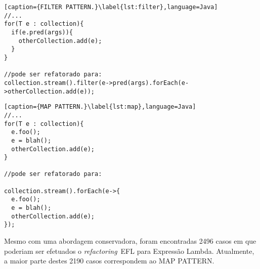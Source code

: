 \begin{lstlisting}[caption={FILTER PATTERN.}\label{lst:filter},language=Java] 
//...
for(T e : collection){
  if(e.pred(args)){
    otherCollection.add(e);
  }
}

//pode ser refatorado para:
collection.stream().filter(e->pred(args).forEach(e->otherCollection.add(e));
\end{lstlisting}

\begin{lstlisting}[caption={MAP PATTERN.}\label{lst:map},language=Java] 
//...
for(T e : collection){
  e.foo();
  e = blah();
  otherCollection.add(e);
}

//pode ser refatorado para:

collection.stream().forEach(e->{
  e.foo();
  e = blah();
  otherCollection.add(e);
});
\end{lstlisting}

Mesmo com uma abordagem conservadora, foram encontradas \num{2496} casos em que poderiam 
ser efetuados o \textit{refactoring}~\acs{EFL} para Expressão Lambda. 
Atualmente, a maior parte destes 2190 casos correspondem ao \textsc{MAP PATTERN}.



